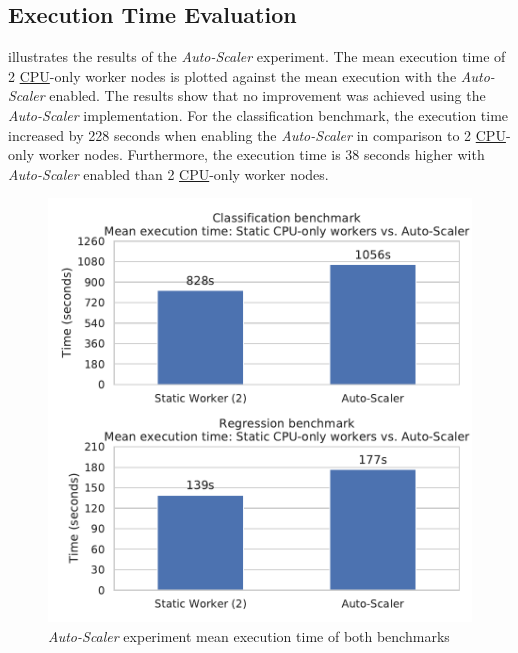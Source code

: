 \subsection{Execution Time Evaluation}
 illustrates the results of the \textit{Auto-Scaler} experiment. The mean execution time of 2 \hyperlink{abbr:cpu}{CPU}-only worker nodes is plotted against the mean execution with the \textit{Auto-Scaler} enabled.
The results show that no improvement was achieved using the \textit{Auto-Scaler} implementation.
For the classification benchmark, the execution time increased by 228 seconds when enabling the \textit{Auto-Scaler} in comparison to 2 \hyperlink{abbr:cpu}{CPU}-only worker nodes. Furthermore, the execution time is 38 seconds higher with \textit{Auto-Scaler} enabled than 2 \hyperlink{abbr:cpu}{CPU}-only worker nodes.
\begin{figure}[h]
\centering
\includegraphics[scale=0.9]{images/07_evaluation/overall_auto-scaler}
\caption{\textit{Auto-Scaler} experiment mean execution time of both benchmarks}
\label{fig:07_auto-scaler_results}
\end{figure}

\newpage
